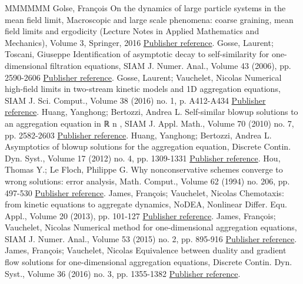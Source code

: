 \documentclass[11pt]{article}
\theoremstyle{definition}
\numberwithin{equation}{section}
\begin{document}
\begin{thebibliography}{MMMMMM}
 Golse, François On the dynamics of large particle systems in the mean field limit, Macroscopic and large scale phenomena: coarse graining, mean field limits and ergodicity (Lecture Notes in Applied Mathematics and Mechanics), Volume 3, Springer, 2016 \href{https://ahl.centre-mersenne.org/item/AHL_2020__3__217_0/#Golse}{Publisher reference}.
 Gosse, Laurent; Toscani, Giuseppe Identification of asymptotic decay to self-similarity for one-dimensional filtration equations, SIAM J. Numer. Anal., Volume 43 (2006), pp. 2590-2606 \href{https://ahl.centre-mersenne.org/item/AHL_2020__3__217_0/#GT}{Publisher reference}.
 Gosse, Laurent; Vauchelet, Nicolas Numerical high-field limits in two-stream kinetic models and 1D aggregation equations, SIAM J. Sci. Comput., Volume 38 (2016) no. 1, p. A412-A434 \href{https://ahl.centre-mersenne.org/item/AHL_2020__3__217_0/#sisc}{Publisher reference}.
 Huang, Yanghong; Bertozzi, Andrea L. Self-similar blowup solutions to an aggregation equation in ℝ n , SIAM J. Appl. Math., Volume 70 (2010) no. 7, pp. 2582-2603 \href{https://ahl.centre-mersenne.org/item/AHL_2020__3__217_0/#Huang2}{Publisher reference}.
 Huang, Yanghong; Bertozzi, Andrea L. Asymptotics of blowup solutions for the aggregation equation, Discrete Contin. Dyn. Syst., Volume 17 (2012) no. 4, pp. 1309-1331 \href{https://ahl.centre-mersenne.org/item/AHL_2020__3__217_0/#Huang1}{Publisher reference}.
 Hou, Thomas Y.; Le Floch, Philippe G. Why nonconservative schemes converge to wrong solutions: error analysis, Math. Comput., Volume 62 (1994) no. 206, pp. 497-530 \href{https://ahl.centre-mersenne.org/item/AHL_2020__3__217_0/#Legloc}{Publisher reference}.
 James, François; Vauchelet, Nicolas Chemotaxis: from kinetic equations to aggregate dynamics, NoDEA, Nonlinear Differ. Equ. Appl., Volume 20 (2013), pp. 101-127 \href{https://ahl.centre-mersenne.org/item/AHL_2020__3__217_0/#NoDEA}{Publisher reference}.
 James, François; Vauchelet, Nicolas Numerical method for one-dimensional aggregation equations, SIAM J. Numer. Anal., Volume 53 (2015) no. 2, pp. 895-916 \href{https://ahl.centre-mersenne.org/item/AHL_2020__3__217_0/#sinum}{Publisher reference}.
 James, François; Vauchelet, Nicolas Equivalence between duality and gradient flow solutions for one-dimensional aggregation equations, Discrete Contin. Dyn. Syst., Volume 36 (2016) no. 3, pp. 1355-1382 \href{https://ahl.centre-mersenne.org/item/AHL_2020__3__217_0/#GF_dual}{Publisher reference}.

\end{thebibliography}
\end{document}
